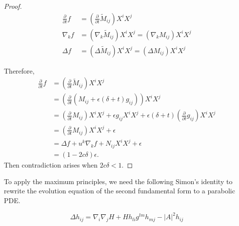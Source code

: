 \begin{proof}
	\begin{align*}
		\frac{\partial }{\partial t} f&=(\frac{\partial }{\partial t} \tilde{M}_{ij }^{}) X^i X^j\\
		\nabla_k f&= (\nabla_k \tilde{M}_{ij }^{}) X^i X^j = (\nabla_k M_{ij }^{} )X^i X^j\\
		\Delta f &= (\Delta  \tilde{M}_{ij }^{}) X^i X^j = (\Delta M_{ij }^{} )X^i X^j
	\end{align*}
	
	Therefore,
	\begin{equation*}
	\begin{split}
		\frac{\partial }{\partial t} f
		&=(\frac{\partial }{\partial t} \tilde{M}_{ij }^{}) X^i X^j\\
	&= (\frac{\partial }{\partial t} (M_{ij }^{} + \epsilon (\delta +t) g_{ij }^{} )) X^i X^j\\
	&= (\frac{\partial }{\partial t} M_{ij }^{} ) X^i X^j +\epsilon g_{ij }^{} X^i X^j+ \epsilon (\delta +t)(\frac{\partial }{\partial t} g_{ij }^{}) X^i X^j\\
	&= (\frac{\partial }{\partial t} M_{ij }^{} ) X^i X^j +\epsilon\\
	&= \Delta f + u^k \nabla_{k}^{} f +N_{ij }^{} X^i X^j + \epsilon \\
	&= (1-2c \delta ) \epsilon.
	\end{split}
	\end{equation*}
	Then contradiction arises when $2c \delta <1.$ 
\end{proof}

To apply the maximum principles, we need the following Simon's identity to rewrite the evolution equation of the second fundamental form to a parabolic PDE.

\begin{lemma}
	 \label{simon}
	\[\Delta h_{ij}^{} = \nabla_{i}\nabla_{j} H + H h_{li}^{} g_{}^{lm } h_{mj}^{} - \left| A \right| ^2 h_{ij}^{} \]
\end{lemma}


